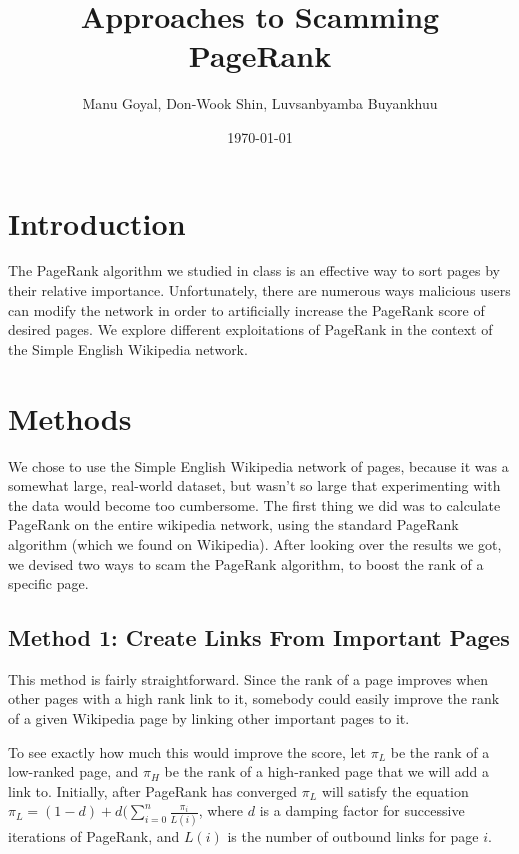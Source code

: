 \message{ !name(report.tex)}\documentclass{article}
\title{Approaches to Scamming PageRank}
\author{Manu Goyal, Don-Wook Shin, Luvsanbyamba Buyankhuu}
\date{\today}
\begin{document}


\maketitle

\section*{Introduction}

The PageRank algorithm we studied in class is an effective way to sort pages by
their relative importance. Unfortunately, there are numerous ways malicious
users can modify the network in order to artificially increase the PageRank
score of desired pages. We explore different exploitations of PageRank in the
context of the Simple English Wikipedia network.

\section*{Methods}

We chose to use the Simple English Wikipedia network of pages, because it was a
somewhat large, real-world dataset, but wasn't so large that experimenting with
the data would become too cumbersome. The first thing we did was to calculate
PageRank on the entire wikipedia network, using the standard PageRank algorithm
(which we found on Wikipedia). After looking over the results we got, we devised
two ways to scam the PageRank algorithm, to boost the rank of a specific page.

\subsection*{Method 1: Create Links From Important Pages}

This method is fairly straightforward. Since the rank of a page improves when
other pages with a high rank link to it, somebody could easily improve the rank
of a given Wikipedia page by linking other important pages to it.

To see exactly how much this would improve the score, let $\pi_L$ be the rank of
a low-ranked page, and $\pi_H$ be the rank of a high-ranked page that we will
add a link to. Initially, after PageRank has converged $\pi_L$ will satisfy the
equation $\pi_L = (1 - d) + d(\sum_{i=0}^n \frac{\pi_i}{L(i)}$, where $d$ is a
damping factor for successive iterations of PageRank, and $L(i)$ is the number
of outbound links for page $i$.
\end{document}
